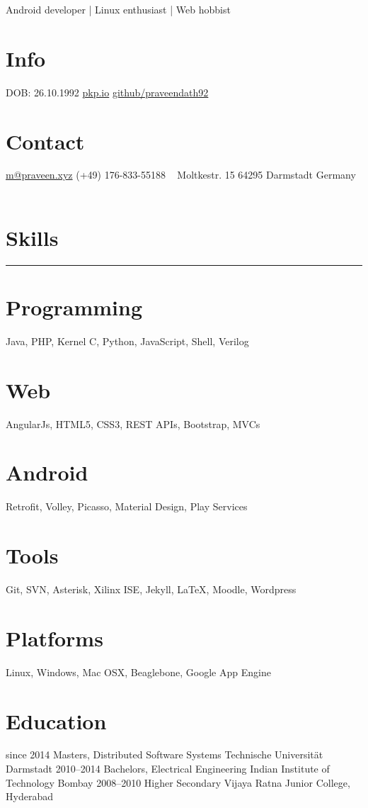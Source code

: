 \documentclass[]{friggeri-cv}
\begin{document}
       {Android developer | Linux enthusiast | Web hobbist}

\begin{aside}
  \section{Info}
    DOB: 26.10.1992
    \href{http://pkp.io}{pkp.io}
    \href{http://github.com/praveendath92}{github/praveendath92}
  \section{Contact}
    \href{mailto:m@praveen.xyz}{m@praveen.xyz}
    (+49) 176-833-55188
    ~
    Moltkestr. 15
    64295 Darmstadt
    Germany
    ~
  \section{Skills}
    \noindent\rule{3cm}{0.1pt}
  \section{Programming}
    Java, PHP, Kernel C, Python, JavaScript, Shell, Verilog
  \section{Web}
    AngularJs, HTML5, CSS3, REST APIs, Bootstrap, MVCs
  \section{Android}
    Retrofit, Volley, Picasso, Material Design, Play Services
  \section{Tools}
    Git, SVN, Asterisk, Xilinx ISE, Jekyll, \LaTeX, Moodle, Wordpress
  \section{Platforms}
    Linux, Windows, Mac OSX, Beaglebone, Google App Engine
\end{aside}


\section{Education}

\begin{entrylist}
  \entry
    {since 2014}
    {Masters, {\normalfont Distributed Software Systems}}
    {Technische Universität Darmstadt}
    {}%
  \entry
    {2010–2014}
    {Bachelors, {\normalfont Electrical Engineering}}
    {Indian Institute of Technology Bombay}
    {}%
  \entry
    {2008–2010}
    {Higher Secondary}
    {Vijaya Ratna Junior College, Hyderabad}
    {}%
\end{entrylist}
\end{document}
